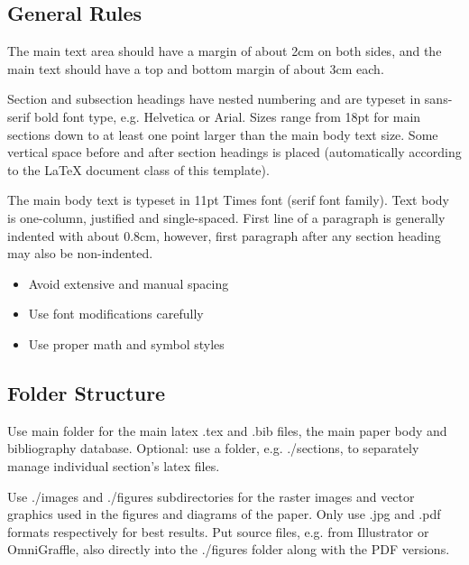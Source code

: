 \documentclass[11pt, a4paper,oneside,chapterprefix=false]{scrbook}
\begin{document}
\subsection*{General Rules}

The main text area should have a margin of about 2cm on both sides, and the main text should have a top and bottom margin of about 3cm each.

Section and subsection headings have nested numbering and are typeset in sans-serif bold font type, e.g. Helvetica or Arial.  Sizes range from 18pt for main sections down to at least one point larger than the main body text size. Some vertical space before and after section headings is placed (automatically according to the LaTeX document class of this template).

The main body text is typeset in 11pt Times font (serif font family). Text body is one-column, justified and single-spaced. First line of a paragraph is generally indented with about 0.8cm, however, first paragraph after any section heading may also be non-indented.

\begin{itemize}
\item Avoid extensive and manual spacing
\item Use font modifications carefully
\item Use proper math and symbol styles
\end{itemize}

\subsection*{Folder Structure}

Use main folder for the main latex .tex and .bib files, the main paper body and bibliography database. Optional: use a folder, e.g. ./sections, to separately manage individual section's latex files.

Use ./images and ./figures subdirectories for the raster images and vector graphics used in the figures and diagrams of the paper.
Only use .jpg and .pdf formats respectively for best results. Put source files, e.g. from Illustrator or OmniGraffle, also directly into the ./figures folder along with the PDF versions.
\end{document}
